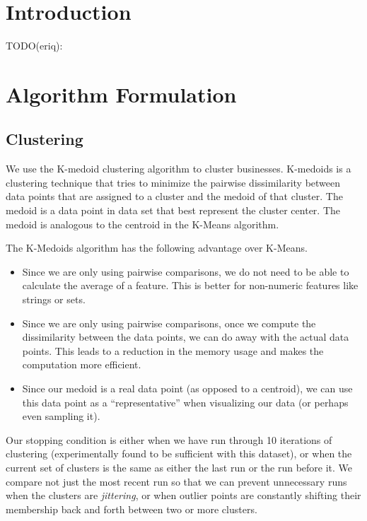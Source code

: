 \documentclass{article}
\begin{document}
\section{Introduction}
   TODO(eriq):

\section{Algorithm Formulation}

   \subsection{Clustering}
      We use the K-medoid clustering algorithm to cluster businesses.
      K-medoids is a clustering technique that tries to minimize the pairwise dissimilarity between data points that are assigned to a cluster and the medoid of that cluster.
      The medoid is a data point in data set that best represent the cluster center.
      The medoid is analogous to the centroid in the K-Means algorithm.

      The K-Medoids algorithm has the following advantage over K-Means.
      \begin{itemize} 
         \setlength\itemsep{0.1cm}
         \item
            Since we are only using pairwise comparisons, we do not need to be able to calculate the average of a feature.
            This is better for non-numeric features like strings or sets.
         \item
            Since we are only using pairwise comparisons, once we compute the dissimilarity between the data points, we can do away with the actual data points.
            This leads to a reduction in the memory usage and makes the computation more efficient.
         \item
            Since our medoid is a real data point (as opposed to a centroid), we can use this data point as a ``representative'' when visualizing our data (or perhaps even sampling it).
      \end{itemize}

      Our stopping condition is either when we have run through 10 iterations of clustering (experimentally found to be sufficient with this dataset),
      or when the current set of clusters is the same as either the last run or the run before it.
      We compare not just the most recent run so that we can prevent unnecessary runs when the clusters are \textit{jittering},
      or when outlier points are constantly shifting their membership back and forth between two or more clusters.
\end{document}
